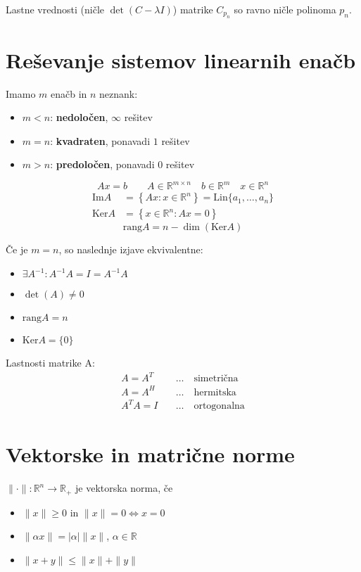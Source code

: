 \begin{multicols}{4}
Lastne vrednosti (ničle $\det(C-\lambda I)$) matrike $C_{p_n}$ so ravno ničle polinoma $p_n$.

\section{Reševanje sistemov linearnih enačb}
Imamo $m$ enačb in $n$ neznank:
\begin{itemize}
	\item $m < n$: \textbf{nedoločen}, $\infty$ rešitev
	\item $m = n$: \textbf{kvadraten}, ponavadi $1$ rešitev
	\item $m > n$: \textbf{predoločen}, ponavadi $0$ rešitev
\end{itemize}

\[ A x = b \qquad A \in \mathbb{R}^{m \times n} \quad b \in \mathbb{R}^m  \quad x \in \mathbb{R}^n\]
\begin{align*}
	\text{Im}A &= \left\{ Ax : x \in \mathbb{R}^n \right\} = \text{Lin}\{a_1, \dots, a_n\} \\
	\text{Ker}A &= \left\{ x \in \mathbb{R}^n : Ax = 0 \right\}
\end{align*}
\[ \text{rang}A = n - \dim (\text{Ker}A)\]

Če je $m=n$, so naslednje izjave ekvivalentne:
\begin{itemize}
	\item $\exists A^{-1}: A^{-1} A = I = A^{-1}A$
	\item $\det(A) \neq 0$
	\item $\text{rang}A = n$
	\item $\text{Ker}A = \{0\}$
\end{itemize}

Lastnosti matrike A:
\begin{align*}
	A = A^T & \quad \dots \quad \text{simetrična} \\
	A = A^H & \quad \dots \quad \text{hermitska} \\
	A^T A = I & \quad \dots \quad \text{ortogonalna}
\end{align*}

\section{Vektorske in matrične norme}
$\|\cdot \| : \mathbb{R}^n \to \mathbb{R}_+$ je vektorska norma, če
\begin{itemize}
	\item $\| x \| \geq 0$ in $\| x \| = 0 \iff x = 0$
	\item $\| \alpha x \| = |\alpha| \| x \|$, $\alpha \in \mathbb{R}$
	\item $\| x + y \| \leq \| x \| + \| y \|$
\end{itemize}


\end{multicols}
